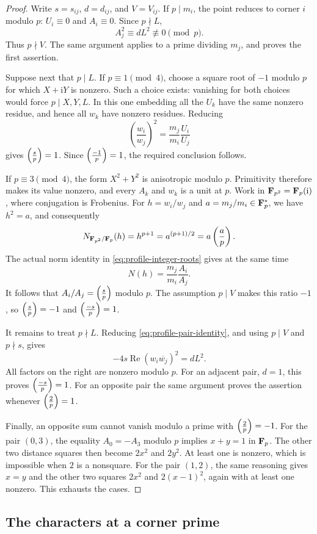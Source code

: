 \begin{proof}
Write $s=s_{ij}$, $d=d_{ij}$, and $V=V_{ij}$.
If $p\mid m_i$, the point reduces to corner $i$ modulo $p$:
$U_i\equiv0$ and $A_i\equiv0$.  Since $p\nmid L$,
\[
 A_j^2\equiv dL^2\not\equiv0\pmod p.
\]
Thus $p\nmid V$.  The same argument applies to a prime dividing $m_j$,
and proves the first assertion.

Suppose next that $p\mid L$.  If $p\equiv1\pmod4$, choose a square
root of $-1$ modulo $p$ for which $X+\mathrm iY$ is nonzero.  Such a
choice exists: vanishing for both choices would force $p\mid X,Y,L$.
In this one embedding all the $U_k$ have the same nonzero residue,
and hence all $w_k$ have nonzero residues.  Reducing
\[
 \left(\frac{w_i}{w_j}\right)^2
   =\frac{m_j}{m_i}\frac{U_i}{U_j}
\]
gives $\left(\frac{s}{p}\right)=1$.  Since $\left(\frac{-1}{p}\right)=1$, the required conclusion
follows.

If $p\equiv3\pmod4$, the form $X^2+Y^2$ is anisotropic modulo $p$.
Primitivity therefore makes its value nonzero, and every $A_k$ and
$w_k$ is a unit at $p$.  Work in $\mathbf F_{p^2}=\mathbf F_p(\mathrm i)$, where
conjugation is Frobenius.  For $h=w_i/w_j$ and $a=m_j/m_i\in\mathbf F_p^*$,
we have $h^2=a$, and consequently
\[
 N_{\mathbf F_{p^2}/\mathbf F_p}(h)=h^{p+1}=a^{(p+1)/2}
     =a\left(\frac{a}{p}\right).
\]
The actual norm identity in \eqref{eq:profile-integer-roots} gives at
the same time
\[
 N(h)=\frac{m_j}{m_i}\frac{A_i}{A_j}.
\]
It follows that $A_i/A_j=\left(\frac{s}{p}\right)$ modulo $p$.  The assumption
$p\mid V$ makes this ratio $-1$, so $\left(\frac{s}{p}\right)=-1$ and
$\left(\frac{-s}{p}\right)=1$.

It remains to treat $p\nmid L$.  Reducing
\eqref{eq:profile-pair-identity}, and using $p\mid V$ and $p\nmid s$,
gives
\[
 -4s\operatorname{Re}(w_i\overline{w_j})^2=dL^2.
\]
All factors on the right are nonzero modulo $p$.  For an adjacent
pair, $d=1$, this proves $\left(\frac{-s}{p}\right)=1$.  For an opposite pair the same
argument proves the assertion whenever $\left(\frac{2}{p}\right)=1$.

Finally, an opposite sum cannot vanish modulo a prime with
$\left(\frac{2}{p}\right)=-1$.  For the pair $(0,3)$, the equality $A_0=-A_3$ modulo $p$
implies $x+y=1$ in $\mathbf F_p$.  The other two distance squares then become
$2x^2$ and $2y^2$.  At least one is nonzero, which is impossible when
$2$ is a nonsquare.  For the pair $(1,2)$, the same reasoning gives
$x=y$ and the other two squares $2x^2$ and $2(x-1)^2$, again with at
least one nonzero.  This exhausts the cases.
\end{proof}

\subsection{The characters at a corner prime}

